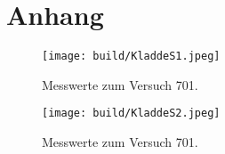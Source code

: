 \section{Anhang}
\label{sec:Anhang}
\begin{figure}[H]
   \centering
    \texttt{[image: build/KladdeS1.jpeg]}
    \caption{Messwerte zum Versuch 701.}
\end{figure}
\begin{figure}[H]
    \centering
    \texttt{[image: build/KladdeS2.jpeg]}
    \caption{Messwerte zum Versuch 701.}
 \end{figure}

